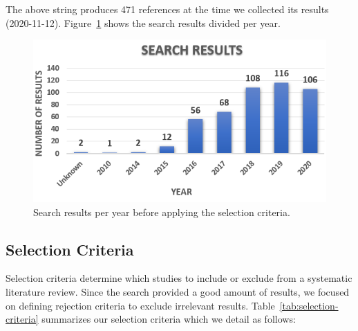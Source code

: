 The above string produces 471 references at the time we collected its results (2020-11-12). 
Figure~\ref{fig:total-papers-per-year} shows the search results divided per year.

\begin{figure}[h]
	\centering
	\includegraphics[width=\linewidth]{images/yearvsarticles.png}
	\caption{Search results per year before applying the selection criteria.}
	\label{fig:total-papers-per-year}
\end{figure}	 


\subsection{Selection Criteria}

Selection criteria determine which studies to include or exclude from a systematic literature review. 
Since the search provided a good amount of results, we focused on defining rejection criteria to exclude irrelevant results. Table~\ref{tab:selection-criteria} summarizes our selection criteria which we detail as follows:


